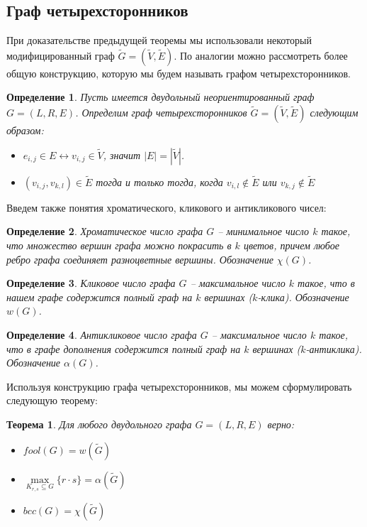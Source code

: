 \documentclass[a4paper]{article}
\newtheorem*{mdefinition}{Определение}
\newtheorem{mtheorem}{Теорема}[section]
\begin{document}
\subsection{Граф четырехсторонников}
При доказательстве предыдущей теоремы мы использовали некоторый модифицированный граф $\widetilde{G} = 
(\widetilde{V}, \widetilde{E})$. По аналогии можно рассмотреть более общую конструкцию, которую мы 
будем называть графом четырехсторонников. 
\begin{mdefinition}
    Пусть имеется двудольный неориентированный граф $G = (L, R, E)$. Определим граф четырехсторонников 
    $\widetilde{G} = (\widetilde{V}, \widetilde{E})$ следующим образом:
    \begin{itemize}[noitemsep]
        \item $e_{i,j}\in E \leftrightarrow v_{i,j}\in \widetilde{V}$, значит $|E| = |\widetilde{V}|$.
        \item $(v_{i,j}, v_{k, l}) \in \widetilde{E}$ тогда и только тогда, когда $v_{i,l}\notin \widetilde{E}$ 
        или $v_{k,j}\notin\widetilde{E}$
    \end{itemize}
\end{mdefinition}

Введем также понятия хроматического, кликового и антикликового чисел:
\begin{mdefinition}

    Хроматическое число графа $G$ -- минимальное число $k$ такое, что множество вершин графа можно 
    покрасить в $k$ цветов, причем любое ребро графа соединяет разноцветные вершины. Обозначение $\chi(G)$.
\end{mdefinition}
\begin{mdefinition} 
    Кликовое число графа $G$ -- максимальное число $k$ такое, что в нашем графе содержится полный 
    граф на $k$ вершинах ($k$-клика). Обозначение $w(G)$.
\end{mdefinition}
\begin{mdefinition} 
    Антикликовое число графа $G$ -- максимальное число $k$ такое, что в графе дополнения содержится 
    полный граф на $k$ вершинах ($k$-антиклика). Обозначение $\alpha(G)$.
\end{mdefinition}


Используя конструкцию графа четырехсторонников, мы можем сформулировать следующую теорему:
\begin{mtheorem}
    Для любого двудольного графа $G = (L, R, E)$ верно:
    \begin{itemize}[noitemsep]
        \item[1)] $fool(G) = w(\widetilde{G})$
        \item[2)] $\max\limits_{K_{r,s}\subseteq G}\{r\cdot s\} = \alpha(\widetilde{G})$
        \item[3)] $bcc(G) = \chi(\widetilde{G})$
    \end{itemize}
\end{mtheorem}
\end{document}
